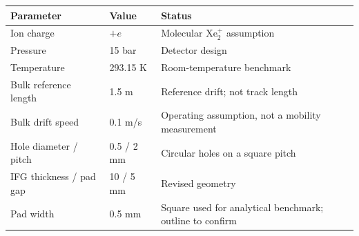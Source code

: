\begin{tabular}{llp{5.6cm}}
\toprule
Parameter & Value & Status \\
\midrule
Ion charge & $+e$ & Molecular $\mathrm{Xe}_2^+$ assumption \\
Pressure & 15 bar & Detector design \\
Temperature & 293.15 K & Room-temperature benchmark \\
Bulk reference length & 1.5 m & Reference drift; not track length \\
Bulk drift speed & 0.1 m/s & Operating assumption, not a mobility measurement \\
Hole diameter / pitch & 0.5 / 2 mm & Circular holes on a square pitch \\
IFG thickness / pad gap & 10 / 5 mm & Revised geometry \\
Pad width & 0.5 mm & Square used for analytical benchmark; outline to confirm \\
\bottomrule
\end{tabular}
